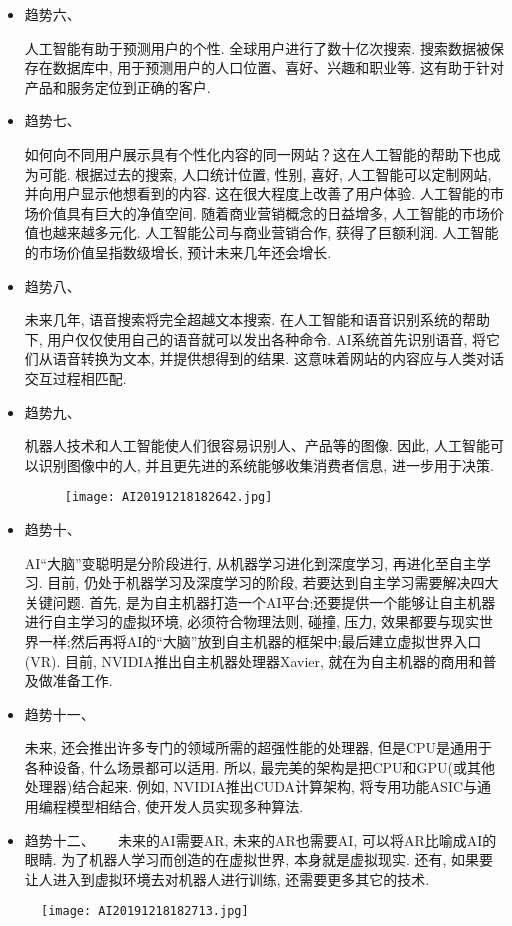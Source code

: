 \begin{itemize}
\item  趋势六、 

人工智能有助于预测用户的个性. 全球用户进行了数十亿次搜索. 搜索数据被保存在数据库中, 用于预测用户的人口位置、喜好、兴趣和职业等. 这有助于针对产品和服务定位到正确的客户.

\item  趋势七、


如何向不同用户展示具有个性化内容的同一网站？这在人工智能的帮助下也成为可能. 根据过去的搜索, 人口统计位置, 性别, 喜好, 人工智能可以定制网站, 并向用户显示他想看到的内容. 这在很大程度上改善了用户体验.
人工智能的市场价值具有巨大的净值空间. 随着商业营销概念的日益增多, 人工智能的市场价值也越来越多元化. 人工智能公司与商业营销合作, 获得了巨额利润. 人工智能的市场价值呈指数级增长, 预计未来几年还会增长.

\item  趋势八、

未来几年, 语音搜索将完全超越文本搜索. 在人工智能和语音识别系统的帮助下, 用户仅仅使用自己的语音就可以发出各种命令. AI系统首先识别语音, 将它们从语音转换为文本, 并提供想得到的结果. 这意味着网站的内容应与人类对话交互过程相匹配.

\item  趋势九、

机器人技术和人工智能使人们很容易识别人、产品等的图像. 因此, 人工智能可以识别图像中的人, 并且更先进的系统能够收集消费者信息, 进一步用于决策.
\begin{figure}[htbp]
	\centering
	\texttt{[image: AI20191218182642.jpg]}
   \label{AI20191218182642}
\end{figure}
\item  趋势十、

AI“大脑”变聪明是分阶段进行, 从机器学习进化到深度学习, 再进化至自主学习. 目前, 仍处于机器学习及深度学习的阶段, 若要达到自主学习需要解决四大关键问题. 首先, 是为自主机器打造一个AI平台;还要提供一个能够让自主机器进行自主学习的虚拟环境, 必须符合物理法则, 碰撞, 压力, 效果都要与现实世界一样;然后再将AI的“大脑”放到自主机器的框架中;最后建立虚拟世界入口(VR). 目前, NVIDIA推出自主机器处理器Xavier, 就在为自主机器的商用和普及做准备工作.
\item  趋势十一、

未来, 还会推出许多专门的领域所需的超强性能的处理器, 但是CPU是通用于各种设备, 什么场景都可以适用. 所以, 最完美的架构是把CPU和GPU(或其他处理器)结合起来. 例如, NVIDIA推出CUDA计算架构, 将专用功能ASIC与通用编程模型相结合, 使开发人员实现多种算法.
\item  趋势十二、
　
未来的AI需要AR, 未来的AR也需要AI, 可以将AR比喻成AI的眼睛. 为了机器人学习而创造的在虚拟世界, 本身就是虚拟现实. 还有, 如果要让人进入到虚拟环境去对机器人进行训练, 还需要更多其它的技术.
\end{itemize}
\begin{figure}[htbp]
	\centering
	\texttt{[image: AI20191218182713.jpg]}
   \label{AI20191218182713}
\end{figure}　

